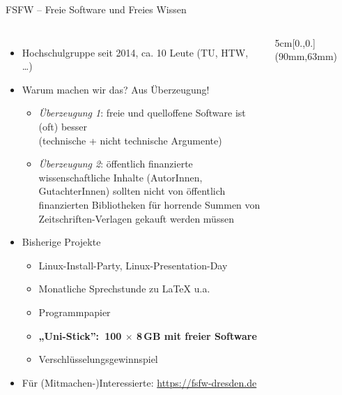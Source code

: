 \documentclass{beamer}
\begin{document}
\begin{frame}{FSFW – Freie Software und Freies Wissen}

  \begin{columns}

\vspace{-5mm}
  \begin{itemize}
  \item Hochschulgruppe seit 2014, ca. 10 Leute (TU, HTW, …)
  \item Warum machen wir das? Aus Überzeugung!

  \begin{itemize}
  \item \emph{Überzeugung 1}: freie und quelloffene Software ist (oft) besser\\
    (technische + nicht technische Argumente)\\
    \bigskip
    \pause
  \item \emph{Überzeugung 2}: öffentlich finanzierte wissenschaftliche Inhalte
    (AutorInnen, GutachterInnen) sollten nicht von öffentlich finanzierten
    Bibliotheken für horrende Summen von Zeitschriften-Verlagen gekauft werden
    müssen
  \end{itemize}

    \pause
  \item Bisherige Projekte
    \begin{itemize}
    \item Linux-Install-Party, Linux-Presentation-Day
    \item Monatliche Sprechstunde zu \LaTeX{} u.a.
    \item Programmpapier
    \item \textbf<4-5>{„Uni-Stick”:~100 $\times$ 8\,GB mit freier Software}
    \item Verschlüsselungsgewinnspiel
    \end{itemize}
    \pause
    \pause
    \pause
    \item Für (Mitmachen-)Interessierte: \url{https://fsfw-dresden.de}
  \end{itemize}

\begin{textblock*}{5cm}[0.,0.](90mm,63mm)
\end{textblock*}

~
\end{columns}
\end{frame}
\end{document}

